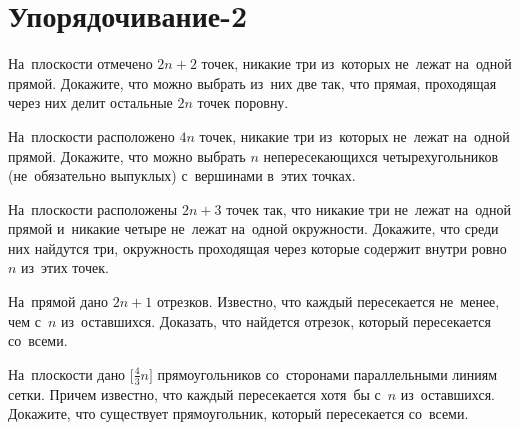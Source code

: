 
\section*{Упорядочивание-2}


\begin{problems}

\item
На~плоскости отмечено $2 n + 2$ точек, никакие три из~которых не~лежат
на~одной прямой.
Докажите, что можно выбрать из~них две так, что прямая, проходящая через них
делит остальные $2 n$ точек поровну.

\item
На~плоскости расположено $4 n$ точек, никакие три из~которых не~лежат на~одной
прямой.
Докажите, что можно выбрать $n$ непересекающихся четырехугольников
(не~обязательно выпуклых) с~вершинами в~этих точках.

\item
На~плоскости расположены $2 n + 3$ точек так, что никакие три не~лежат
на~одной прямой и~никакие четыре не~лежат на~одной окружности.
Докажите, что среди них найдутся три, окружность проходящая через которые
содержит внутри ровно $n$ из~этих точек.

\item
На~прямой дано $2 n + 1$ отрезков.
Известно, что каждый пересекается не~менее, чем с~$n$ из~оставшихся.
Доказать, что найдется отрезок, который пересекается со~всеми.

\item
На~плоскости дано $\bigl[ \frac{4}{3} n \bigr]$ прямоугольников со~сторонами
параллельными линиям сетки.
Причем известно, что каждый пересекается хотя~бы с~$n$ из~оставшихся.
Докажите, что существует прямоугольник, который пересекается со~всеми.

\end{problems}

